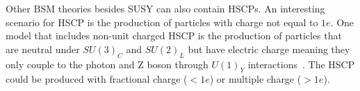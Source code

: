 Other BSM theories besides SUSY can also contain HSCPs.
An interesting scenario for HSCP is the production of particles with charge not equal to $1e$.
One model that includes non-unit charged HSCP is the production of particles that are neutral under $SU(3)_C$ and $SU(2)_L$ 
but have electric charge meaning they only couple to the photon and Z boson through $U(1)_Y$ interactions~\cite{Langacker:2011db}.
The HSCP could be produced with fractional charge ($<1e$) or multiple charge ($>1e$).


